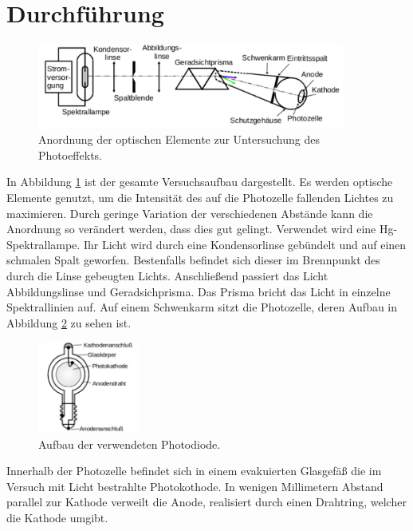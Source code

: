 \section{Durchf\"uhrung}
\label{sec:Durchfuehrung}

\begin{figure}
	\centering
	\includegraphics[width=0.9\textwidth]{Bilder/Aufbau.pdf}
	\caption{Anordnung der optischen Elemente zur Untersuchung des Photoeffekts. \cite{skript}}
	\label{fig:Aufbau}
\end{figure}
In Abbildung \ref{fig:Aufbau} ist der gesamte Versuchsaufbau dargestellt. 
Es werden optische Elemente genutzt, um die Intensität des auf die Photozelle fallenden Lichtes zu maximieren. 
Durch geringe Variation der verschiedenen Abstände kann die Anordnung so verändert werden, dass dies gut gelingt. 
Verwendet wird eine Hg-Spektrallampe.
Ihr Licht wird durch eine Kondensorlinse gebündelt und auf einen schmalen Spalt geworfen. 
Bestenfalls befindet sich dieser im Brennpunkt des durch die Linse gebeugten Lichts.
Anschließend passiert das Licht Abbildungslinse und Geradsichprisma. 
Das Prisma bricht das Licht in einzelne Spektrallinien auf. 
Auf einem Schwenkarm sitzt die Photozelle, deren Aufbau in Abbildung \ref{fig:Photozelle} zu sehen ist. 
\begin{figure}[H]
	\centering
	\includegraphics[width=0.3\textwidth]{Bilder/Schema_Photozelle.pdf}
	\caption{Aufbau der verwendeten Photodiode. \cite{skript}}
	\label{fig:Photozelle}
\end{figure}

Innerhalb der Photozelle befindet sich in einem evakuierten Glasgefäß die im Versuch mit Licht bestrahlte Photokothode. 
In wenigen Millimetern Abstand parallel zur Kathode verweilt die Anode, realisiert durch einen Drahtring, welcher die Kathode umgibt. 


